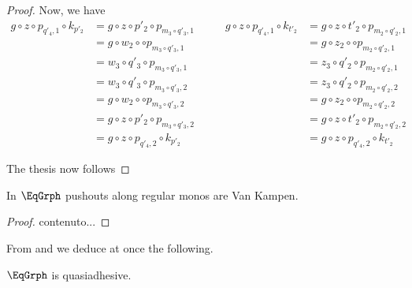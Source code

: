 \begin{proof}
Now, we have
\[
\begin{split}
	g\circ z\circ p_{q'_4,1} \circ k_{p'_2}&=g\circ z\circ p'_2\circ p_{m_3\circ q'_3, 1}\\&=g\circ w_2\circ \circ  p_{m_3\circ q'_3, 1}\\&=w_3\circ q'_3\circ p_{m_3\circ q'_3, 1}\\&=w_3\circ q'_3\circ p_{m_3\circ q'_3, 2}\\&=g\circ w_2\circ \circ  p_{m_3\circ q'_3, 2}\\&=g\circ z\circ p'_2\circ p_{m_3\circ q'_3, 2}\\&=g\circ z\circ p_{q'_4,2} \circ k_{p'_2}
\end{split} \qquad 
\begin{split}
g\circ z\circ p_{q'_4,1} \circ k_{t'_2}&=g\circ z\circ t'_2\circ p_{m_2\circ q'_2, 1}\\&=g\circ z_2\circ \circ  p_{m_2\circ q'_2, 1}\\&=z_3\circ q'_2\circ p_{m_2\circ q'_2, 1}\\&=z_3\circ q'_2\circ p_{m_2\circ q'_2, 2}\\&=g\circ z_2\circ \circ  p_{m_2\circ q'_2, 2}\\&=g\circ z\circ t'_2\circ p_{m_2\circ q'_2, 2}\\&=g\circ z\circ p_{q'_4,2} \circ k_{t'_2}
\end{split}
\]

The thesis now follows 







\end{proof}


\begin{lemma}\label{lem:vk}
In $\EqGrph$ pushouts along regular monos are Van Kampen.
\end{lemma}
\begin{proof}
	contenuto...
\end{proof}

From  and  we deduce at once the following.

\begin{cor}\label{cor:equi}
	$\EqGrph$ is quasiadhesive.
\end{cor}

\color{black}
